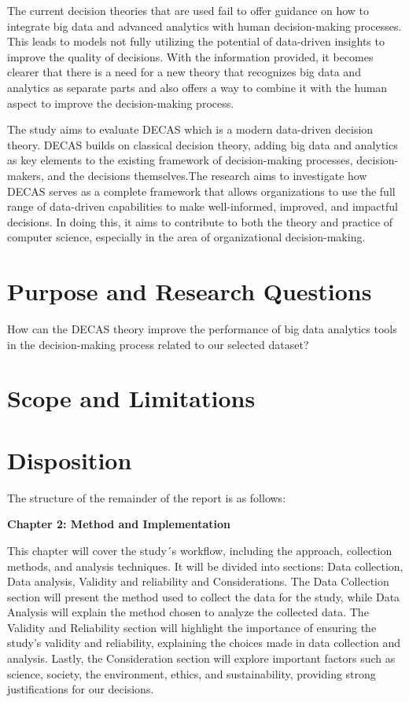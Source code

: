 The current decision theories that are used fail to offer guidance on how to integrate big data and advanced analytics with human decision-making processes. This leads to models not fully utilizing the potential of data-driven insights to improve the quality of decisions. With the information provided, it becomes clearer that there is a need for a new theory that recognizes big data and analytics as separate parts and also offers a way to combine it with the human aspect to improve the decision-making process.

The study aims to evaluate DECAS which is a modern data-driven decision theory. DECAS builds on classical decision theory, adding big data and analytics as key elements to the existing framework of decision-making processes, decision-makers, and the decisions themselves.The research aims to investigate how DECAS serves as a complete framework that allows organizations to use the full range of data-driven capabilities to make well-informed, improved, and impactful decisions. In doing this, it aims to contribute to both the theory and practice of computer science, especially in the area of organizational decision-making.

\section{Purpose and Research Questions}
How can the DECAS theory improve the performance of big data analytics tools in the decision-making process related to our selected dataset?



\section{Scope and Limitations}

\section{Disposition}
The structure of the remainder of the report is as follows: 

\textbf{Chapter 2: Method and Implementation}

This chapter will cover the study´s workflow, including the approach, collection methods, and analysis techniques. It will be divided into sections: Data collection, Data analysis, Validity and reliability and Considerations. The Data Collection section will present the method used to collect the data for the study, while Data Analysis will explain the method chosen to analyze the collected data. The Validity and Reliability section will highlight the importance of ensuring the study’s validity and reliability, explaining the choices made in data collection and analysis. Lastly, the Consideration section will explore important factors such as science, society, the environment, ethics, and sustainability, providing strong justifications for our decisions.




